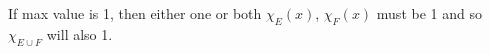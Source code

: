 \documentclass[preview]{standalone}
\begin{document}
\begin{center}
If max value is 1, then either one or both $\chi_{E}(x)$, $\chi_{F}(x)$ must be 1 and so $\chi_{E \cup F}$ will also 1.
\end{center}
\end{document}
